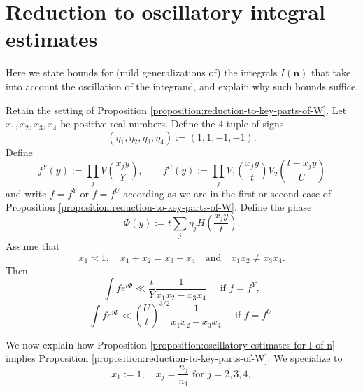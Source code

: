 \documentclass[reqno]{amsart} 
\begin{document}
\section{Reduction to oscillatory integral estimates}\label{sec:reduction-oscillatory-integral-estimates}
Here we state bounds for (mild generalizations of) the integrals $I(\mathbf{n})$ that take into account the oscillation of the integrand, and explain why such bounds suffice.
\begin{proposition}\label{proposition:oscillatory-estimates-for-I-of-n}
  Retain the setting of Proposition \ref{proposition:reduction-to-key-parts-of-W}.  Let $x_1, x_2, x_3, x_4$ be positive real numbers.  Define the $4$-tuple of signs
  \begin{equation*}
    (\eta_1, \eta_2, \eta_3, \eta_4) := (1, 1, -1, -1).
  \end{equation*}
  Define
  \begin{equation*}
    f^Y (y) :=
    \prod_{j} V \left( \frac{x_j y}{Y} \right),
    \quad
    \quad
    f^U(y) :=
    \prod_j V _1 \left( \frac{x _j y}{t} \right) V _2 \left( \frac{t - x _j y}{U} \right)
  \end{equation*}
  and write $f = f^Y$ or $f = f^U$ according as we are in the first or second case of Proposition \ref{proposition:reduction-to-key-parts-of-W}.  Define the phase
  \begin{equation*}
    \Phi(y) := t \sum_{j} \eta_j  H \left( \frac{x_j y}{t} \right).
  \end{equation*}
  Assume that
  \begin{equation}\label{eqn:x1x2-not-x3x4}
    x_1 \asymp 1, \quad x_1 + x_2 = x_3 + x_4 \quad \text{and} \quad x_1 x_2 \neq x_3 x_4.
  \end{equation}
  Then
  \begin{equation*}
    \int f e ^{i \Phi } \ll \frac{t}{Y} \frac{1}{ x _1 x _2 - x _3 x _4 } \quad \text{ if }  f = f ^Y,
  \end{equation*}
  \begin{equation*}
    \int f e ^{i \Phi } \ll \left( \frac{U}{t} \right) ^{3/2} \frac{1}{ x _1 x _2 - x _3 x _4 } \quad \text{ if }  f = f ^U.
  \end{equation*}
\end{proposition}
We now explain how Proposition \ref{proposition:oscillatory-estimates-for-I-of-n} implies Proposition \ref{proposition:reduction-to-key-parts-of-W}.  We specialize to
\begin{equation*}
  x_1 := 1, \quad x_j = \frac{n_j}{n_1} \text{ for } j=2,3,4,
\end{equation*}
\end{document}

